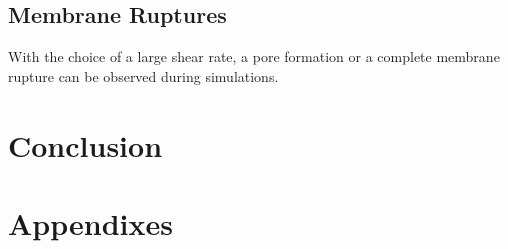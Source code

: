 \documentclass[%
 reprint,
 amsmath,amssymb,
 aps,
]{revtex4-2}
\begin{document}
\subsection{Membrane Ruptures}

With the choice of a large shear rate, a pore formation or a complete membrane rupture can be observed during simulations. 



\section{\label{conclusion}Conclusion}


\begin{acknowledgments}
\end{acknowledgments}

\appendix

\section{Appendixes}
\end{document}

